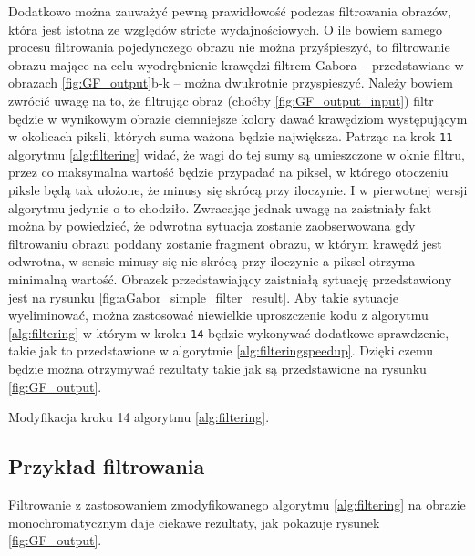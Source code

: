 Dodatkowo można zauważyć pewną prawidłowość podczas filtrowania obrazów, która jest istotna ze względów stricte wydajnościowych. O ile bowiem samego procesu filtrowania pojedynczego obrazu nie można przyśpieszyć, to filtrowanie obrazu mające na celu wyodrębnienie krawędzi filtrem Gabora -- przedstawiane w obrazach \ref{fig:GF_output}b-k -- można dwukrotnie przyspieszyć. Należy bowiem zwrócić uwagę na to, że filtrując obraz (choćby \ref{fig:GF_output_input}) filtr będzie w wynikowym obrazie ciemniejsze kolory dawać krawędziom występującym w okolicach piksli, których suma ważona będzie największa. Patrząc na krok \texttt{11} algorytmu \ref{alg:filtering} widać, że wagi do tej sumy są umieszczone w oknie filtru, przez co maksymalna wartość będzie przypadać na piksel, w którego otoczeniu piksle będą tak ułożone, że minusy się skrócą przy iloczynie. I w pierwotnej wersji algorytmu jedynie o to chodziło. Zwracając jednak uwagę na zaistniały fakt można by powiedzieć, że odwrotna sytuacja zostanie zaobserwowana gdy filtrowaniu obrazu poddany zostanie fragment obrazu, w którym krawędź jest odwrotna, w sensie minusy się nie skrócą przy iloczynie a piksel otrzyma minimalną wartość. Obrazek przedstawiający zaistniałą sytuację przedstawiony jest na rysunku \ref{fig:aGabor_simple_filter_result}. Aby takie sytuacje wyeliminować, można zastosować niewielkie uproszczenie kodu z algorytmu \ref{alg:filtering} w którym w kroku \texttt{14} będzie wykonywać dodatkowe sprawdzenie, takie jak to przedstawione w algorytmie \ref{alg:filteringspeedup}. Dzięki czemu będzie można otrzymywać rezultaty takie jak są przedstawione na rysunku \ref{fig:GF_output}.

\begin{algorithm}
\caption{Modyfikacja kroku 14 algorytmu \ref{alg:filtering}.}
\label{alg:filteringspeedup}

\end{algorithm}


\subsection{Przykład filtrowania}
\label{aGabor_przyklad}

Filtrowanie z zastosowaniem zmodyfikowanego algorytmu \ref{alg:filtering} na obrazie monochromatycznym daje ciekawe rezultaty, jak pokazuje rysunek \ref{fig:GF_output}.

